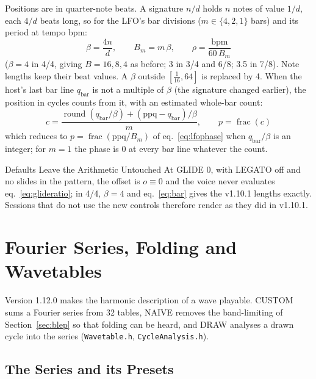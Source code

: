 \documentclass[11pt,letterpaper]{article}
\newcommand{\code}[1]{\texttt{\textcolor{codegray}{#1}}}
\newcommand{\frc}{\operatorname{frac}}
\begin{document}
Positions are in quarter-note beats. A signature $n/d$ holds $n$ notes of value $1/d$, each $4/d$ beats long, so for the LFO's
bar divisions ($m \in \{4, 2, 1\}$ bars) and its period at tempo bpm:
\begin{equation}\label{eq:bar}
  \beta = \frac{4n}{d}, \qquad B_m = m\,\beta, \qquad \rho = \frac{\mathrm{bpm}}{60\,B_m}
\end{equation}
($\beta = 4$ in 4/4, giving $B = 16, 8, 4$ as before; 3 in 3/4 and 6/8; 3.5 in 7/8). Note lengths keep their beat values.
A $\beta$ outside $[\tfrac1{16}, 64]$ is replaced by 4. When the host's last bar line $q_{\mathrm{bar}}$ is not a multiple of $\beta$ (the
signature changed earlier), the position in cycles counts from it, with an estimated whole-bar count:
\begin{equation}\label{eq:barpos}
  c = \frac{\operatorname{round}(q_{\mathrm{bar}}/\beta) + (\mathrm{ppq} - q_{\mathrm{bar}})/\beta}{m}, \qquad p = \frc(c)
\end{equation}
which reduces to $p = \frc(\mathrm{ppq}/B_m)$ of eq.~\eqref{eq:lfophase} when $q_{\mathrm{bar}}/\beta$ is an integer; for $m = 1$ the phase is 0 at
every bar line whatever the count.

\begin{callout}{Defaults Leave the Arithmetic Untouched}
At GLIDE 0, with LEGATO off and no slides in the pattern, the offset is $o \equiv 0$ and the voice never evaluates eq.~\eqref{eq:glideratio}; in 4/4, $\beta = 4$ and eq.~\eqref{eq:bar} gives the
v1.10.1 lengths exactly. Sessions that do not use the new controls therefore render as they did in v1.10.1.
\end{callout}


\newpage
\section{Fourier Series, Folding and Wavetables}\label{sec:fourier}

Version 1.12.0 makes the harmonic description of a wave playable. CUSTOM sums a Fourier series from 32 tables, NAIVE removes
the band-limiting of Section~\ref{sec:blep} so that folding can be heard, and DRAW analyses a drawn cycle into the series
(\code{Wavetable.h}, \code{CycleAnalysis.h}).

\subsection{The Series and its Presets}
\end{document}
